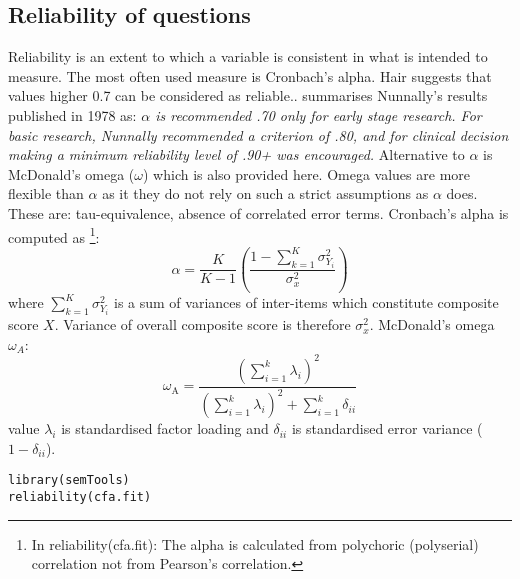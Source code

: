 \documentclass[10pt,a4paper]{article}
\begin{document}
\subsection{Reliability of questions}
Reliability is an extent to which a variable is consistent in what is intended to measure. The most often used measure is Cronbach's alpha. Hair suggests that values higher 0.7 can be considered as reliable.\cite{hair}. \cite{stough} summarises  Nunnally's results published in 1978 as: \emph{$\alpha$ is recommended .70 only for early stage research. For basic research, Nunnally recommended a criterion of .80, and for clinical decision making a minimum reliability level of .90+ was encouraged.} Alternative to $\alpha$ is McDonald's omega ($\omega$) which is also provided here. Omega values are more flexible than $\alpha$ as it they do not rely on such a strict assumptions as $\alpha$ does. These are: tau-equivalence, absence of correlated error terms. \cite{stough} \newline 
Cronbach's alpha is computed as \footnote{In reliability(cfa.fit): The alpha is calculated from polychoric (polyserial) correlation not from Pearson's correlation.}:
\begin{equation}
\alpha=\frac{K}{K-1} \left(\frac{1-\sum^K_{k=1}\sigma^2_{Y_i}}{\sigma^2_x} \right)
\label{e:cron}
\end{equation}
where $\sum^K_{k=1}\sigma^2_{Y_i}$ is a sum of variances of inter-items which constitute composite score $X$. Variance of overall composite score is therefore $\sigma^2_x$.\newline
McDonald's omega $\omega_A$:
\begin{equation}
\omega_\text{A}=\frac{\left(\displaystyle\sum_{i=1}^k \lambda_i \right)^2}{\left(\displaystyle\sum_{i=1}^k \lambda_i \right)^2 + \displaystyle\sum_{i=1}^k \delta_{ii}}
\label{e:omegaa}
\end{equation}
value $\lambda_i$ is standardised factor loading and $\delta_{ii}$ is standardised error variance ($1-\delta_{ii}$).

\begin{lstlisting}
library(semTools)
reliability(cfa.fit)
\end{lstlisting}
\end{document}
